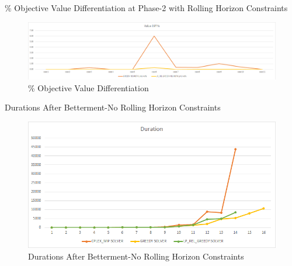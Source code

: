 \documentclass[11pt]{article}
\begin{document}
{\begin{landscape}
        \begin{table}[htb]
                \centering
                \caption[Short Caption for LoT]{\% Objective Value Differentiation at Phase-2 with Rolling Horizon Constraints}\label{table:tbl_test_obj_diff_with_rh_ph2}
        \end{table}
        \begin{figure}[htp]
            \centering
            \includegraphics[width=20cm]{value_diff_with_rh}
            \caption{\% Objective Value Differentiation}
            \label{fig:fig_value_diff_with_rh}
        \end{figure}
\newpage
        \begin{table}[htb]
                \centering
                \caption[Short Caption for LoT]{Durations After Betterment-No Rolling Horizon Constraints}\label{table:tbl_test_durations_bett_no_rh}
        \end{table}
        \begin{figure}[htp]
            \centering
            \includegraphics[width=12cm]{durations_bett_no_rh}
            \caption{Durations After Betterment-No Rolling Horizon Constraints}
            \label{fig:fig_durations_bett_no_rh}
        \end{figure}


\end{landscape}}
\end{document}
